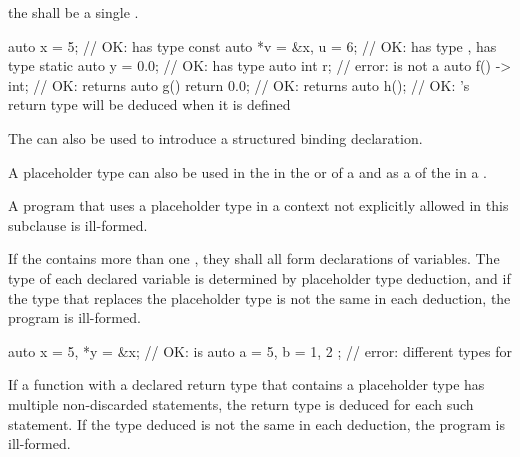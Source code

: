 the  shall be a single
.
\begin{example}
\begin{codeblock}
auto x = 5;                     // OK:  has type 
const auto *v = &x, u = 6;      // OK:  has type ,  has type 
static auto y = 0.0;            // OK:  has type 
auto int r;                     // error:  is not a 
auto f() -> int;                // OK:  returns 
auto g() { return 0.0; }        // OK:  returns 
auto h();                       // OK: 's return type will be deduced when it is defined
\end{codeblock}
\end{example}
The  
can also be used to introduce
a structured binding declaration.

\pnum
A placeholder type can also be used
in the  in
the  or  of a
and as a 
of the 
in a .

\pnum
A program that uses a placeholder type in a context not
explicitly allowed in this subclause is ill-formed.

\pnum
If the  contains more than one
, they shall all form declarations of
variables. The type of each declared variable is determined
by placeholder type deduction,
and if the type that replaces the placeholder type is not the
same in each deduction, the program is ill-formed.

\begin{example}
\begin{codeblock}
auto x = 5, *y = &x;            // OK:  is 
auto a = 5, b = { 1, 2 };       // error: different types for 
\end{codeblock}
\end{example}

\pnum
If a function with a declared return type that contains a placeholder type has
multiple non-discarded  statements, the return type is deduced for each
such  statement. If the type deduced is not the same in each
deduction, the program is ill-formed.


